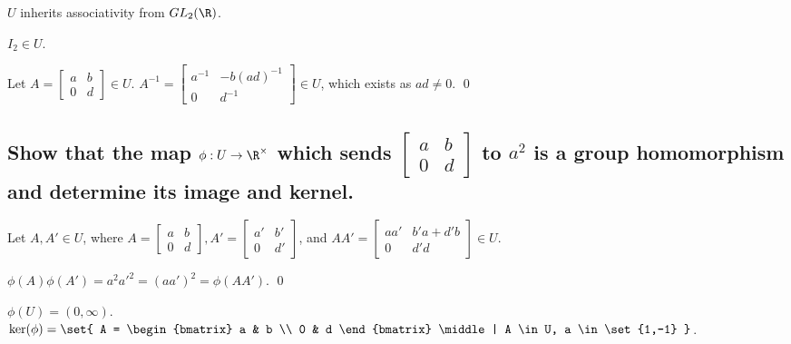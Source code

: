         $U$ inherits associativity from $GL_2(\R)$.

        $I_2 \in U$.

        Let $A = 
        \begin{bmatrix}
            a & b \\
            0 & d
        \end{bmatrix} \in U$.
        $A^{-1} = \begin{bmatrix}
            a^{-1} & -b(ad)^{-1} \\
            0 & d^{-1}
        \end{bmatrix} \in U$, which exists as $ad \neq 0$.
        \qed

    \subsection[(iii)]{Show that the map $\phi : U \to \R^\times$
        which sends 
        \(
            \begin{bmatrix}
                a & b \\
                0 & d
            \end{bmatrix}
        \) 
        to $a^2$ is a group homomorphism and determine its image and kernel.
    }
        Let $A,A' \in U$,
        where $
        A = 
        \begin{bmatrix}
            a & b \\
            0 & d
        \end{bmatrix},
        A' = 
        \begin{bmatrix}
            a' & b' \\
            0 & d'
        \end{bmatrix}$,
        and $AA' = \begin{bmatrix}
            aa' & b'a + d'b \\
            0 & d'd
        \end{bmatrix} \in U$.

        $\phi(A)\phi(A') = a^2a'^2 = (aa')^2 = \phi(AA')$.
        \qed

        $\phi(U) = (0,\infty)$.
        \(
            \ker(\phi) =
            \set{
                A = 
                \begin{bmatrix}
                    a & b \\
                    0 & d
                \end{bmatrix}
                \middle | A \in U, a \in \set{1,-1}
            }
        \).